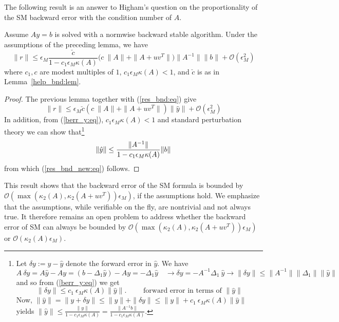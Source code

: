 \documentclass{siamltex}
\newcommand{\eqnref}[1]{(\ref{#1})}
\newcommand{\eps}{\epsilon}
\begin{document}
The following result is an answer to Higham's question on the proportionality of the SM backward error with the condition number of $A$.
\begin{proposition}
Assume $Ay=b$ is solved with a normwise backward stable algorithm. Under the assumptions of the preceding lemma, we have
\begin{equation}
\label{res_bnd_new:eq}
\| r \| \leq \eps_M  \frac{\check c}{1 - c_1 \eps_M \kappa(A)}  \Big( c\ \| A\| + \| A + uv^T\| \Big) \| A^{-1}\| \|b\| + \mathcal{O}(\eps_M^2) 
\end{equation}
where $c_1, c$ are modest multiples of $1$, $c_1 \eps_M \kappa(A) < 1$, and $\check c$ is as in Lemma~\ref{help_bnd:lem}.
\end{proposition}
\begin{proof}
The previous lemma together with \eqnref{res_bnd:eq} give 
\[
\| r \| \leq \eps_M  \check c  (c\ \| A\| + \| A + uv^T\|) \|\hat y\| + \mathcal{O}(\eps_M^2) 
\]
In addition, from \eqnref{berr_y:eq}, $c_1 \eps_M \kappa(A) < 1$ and standard perturbation theory \cite[p. 54]{Stewart98} we can show that\footnote{Let $\delta y := y - \hat y$ denote the forward error in $\hat y$. We have
\[
A\ \delta y = A \hat y - A y  = (b - \Delta_1 \hat y) - Ay = - \Delta_1 \hat y \quad \to \delta y = -A^{-1} \Delta_1\ \hat y \to
\| \delta y \| \leq \|A^{-1}\| \| \Delta_1\|  \|\hat y\|
\]
and so from \eqnref{berr_y:eq} we get 
\[
\| \delta y \| \leq c_1\ \eps_M \kappa(A) \|\hat y\|. \qquad \mbox{ forward error in terms of } \|\hat y\|
\] Now, $\| \hat y \| = \|y + \delta y\| \leq \|y\| + \|\delta y\| \leq \|y \| + c_1\ \eps_M \kappa(A) \|\hat y\|$ yields
$\| \hat y \| \leq \frac{\| y\| }{1 - c_1 \eps_M \kappa(A)} = \frac{\| A^{-1} b\| }{1 - c_1 \eps_M \kappa(A)}.$
}
\begin{equation}
\label{temp_ineq2:eq}
\| \hat y \| \leq \frac{\| A^{-1}\| }{1 - c_1 \eps_M \kappa(A)} \| b\| \\
\end{equation}
from which \eqnref{res_bnd_new:eq} follows.
\end{proof}

This result shows that the backward error of the SM formula is bounded by $\mathcal{O}(\max(\kappa_2(A),\kappa_2(A+uv^T))\eps_M)$, if the assumptions hold. We emphasize that the assumptions, while verifiable on the fly, are nontrivial and not always true. It therefore remains an open problem to address whether the backward error of SM can always be bounded by $\mathcal{O}(\max(\kappa_2(A),\kappa_2(A+uv^T))\eps_M)$ or $\mathcal{O}(\kappa_2(A)\eps_M)$. 
\end{document}
